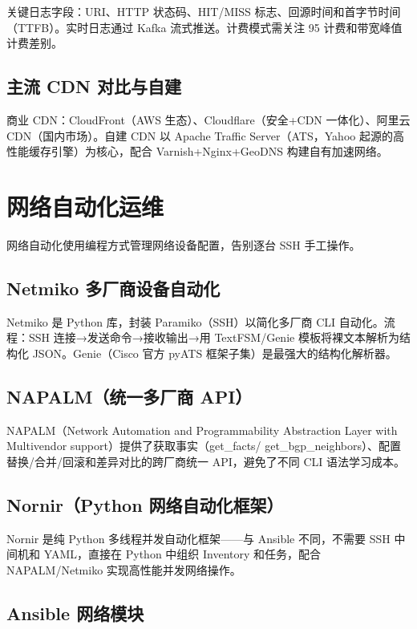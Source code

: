 \documentclass[12pt,UTF8]{ctexbook}
\begin{document}
关键日志字段：URI、HTTP 状态码、HIT/MISS 标志、回源时间和首字节时间（TTFB）。实时日志通过 Kafka 流式推送。计费模式需关注 95 计费和带宽峰值计费差别。

  \section{主流 CDN 对比与自建}

商业 CDN：CloudFront（AWS 生态）、Cloudflare（安全+CDN 一体化）、阿里云 CDN（国内市场）。自建 CDN 以 Apache Traffic Server（ATS，Yahoo 起源的高性能缓存引擎）为核心，配合 Varnish+Nginx+GeoDNS 构建自有加速网络。


\chapter{网络自动化运维}
\label{chap:net-automation}

网络自动化使用编程方式管理网络设备配置，告别逐台 SSH 手工操作。

  \section{Netmiko 多厂商设备自动化}

Netmiko 是 Python 库，封装 Paramiko（SSH）以简化多厂商 CLI 自动化。流程：SSH 连接→发送命令→接收输出→用 TextFSM/Genie 模板将裸文本解析为结构化 JSON。Genie（Cisco 官方 pyATS 框架子集）是最强大的结构化解析器。

  \section{NAPALM（统一多厂商 API）}

NAPALM（Network Automation and Programmability Abstraction Layer with Multivendor support）提供了获取事实（get\_facts/ get\_bgp\_neighbors）、配置替换/合并/回滚和差异对比的跨厂商统一 API，避免了不同 CLI 语法学习成本。

  \section{Nornir（Python 网络自动化框架）}

Nornir 是纯 Python 多线程并发自动化框架——与 Ansible 不同，不需要 SSH 中间机和 YAML，直接在 Python 中组织 Inventory 和任务，配合 NAPALM/Netmiko 实现高性能并发网络操作。

  \section{Ansible 网络模块}
\end{document}
